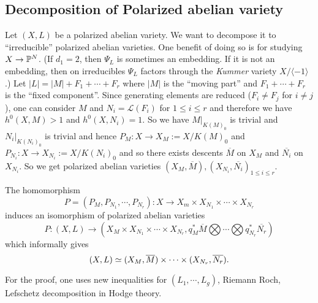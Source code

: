 \subsection{Decomposition of Polarized abelian variety}
Let $(X,L)$ be a polarized abelian variety. We want to decompose it to ``irreducible'' polarized abelian varieties. One benefit of doing so is for studying $X\to {\mathbb P}^N$. (If $d_1=2$, then $\Psi_L$ is sometimes an embedding. If it is not an embedding, then on irreducibles $\Psi_L$ factors through the \emph{Kummer} variety $X/\langle -1\rangle$.) Let $|L|=|M|+F_1+\cdots+F_r$ where $|M|$ is the ``moving part'' and $F_1+\cdots+F_r$ is the ``fixed component''. Since generating elements are reduced ($F_i\not=F_j$ for $i\not=j$), one can consider $M$ and $N_i=\mathcal{L}(F_i)$ for $1\leq i\leq r$ and therefore we have $h^0(X,M)>1$ and $h^0(X,N_i)=1$. So we have $M|_{K(M)_0}$ is trivial and $N_i|_{K(N_i)_0}$ is trivial and hence $P_M:X\to X_M:=X/K(M)_0$ and $P_{N_i}:X\to X_{N_i}:=X/K(N_i)_0$ and so there exists descents $\overline{M}$ on $X_M$ and $\overline{N_i}$ on $X_{N_i}$. So we get polarized abelian varieties $(X_M,\overline{M}),(X_{N_i},\overline{N_i})_{1\leq i \leq r}$. 

\begin{theorem}
The homomorphism 
$$P=(P_M,P_{N_1},\cdots,P_{N_r}):X\to X_m\times X_{N_1}\times\cdots \times X_{N_r}$$
induces an isomorphism of polarized abelian varieties
$$P:(X,L)\to (X_M\times X_{N_1}\times \cdots \times X_{N_r}, q_M^* \overline{M}\bigotimes \cdots \bigotimes q_{N_r}^* \overline{N_r})$$
which informally gives 
$$(X,L)\simeq (X_M,\overline{M})\times \cdots \times (X_{N_r},\overline{N_r}).$$
\end{theorem}

For the proof, one uses new inequalities for $(L_1,\cdots, L_g)$, Riemann Roch, Lefschetz decomposition in Hodge theory.